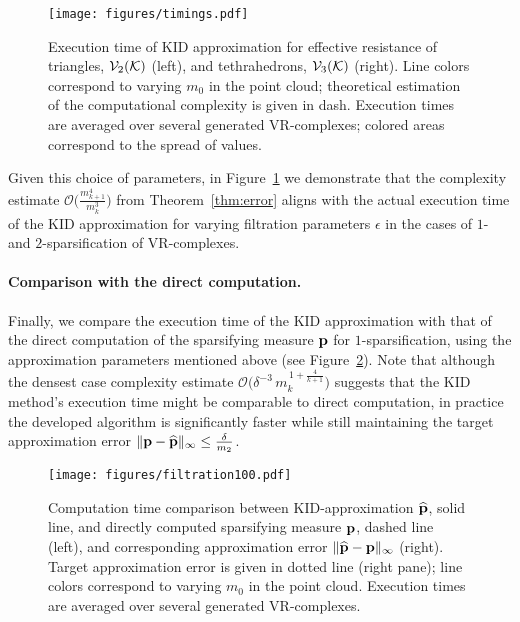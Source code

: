 \begin{figure}[t]
      \centering
      \texttt{[image: figures/timings.pdf]}
      \caption{
            Execution time of KID approximation for effective resistance of triangles, \( \mathcal{V}_{2}(\mathcal{K})\) (left), and tethrahedrons, \( \mathcal{V}_{3}(\mathcal{K}) \) (right). Line colors correspond to varying \( m_0 \)  in the point cloud; theoretical estimation of the computational complexity is given in dash.
            Execution times are averaged over several generated VR-complexes; colored areas correspond to the spread of values.  \label{fig:times}
       }
\end{figure}

Given this choice of parameters, in Figure~\ref{fig:times} we demonstrate that the complexity estimate
\(\mathcal{O}\!\bigl(\tfrac{m_{k+1}^4}{m_k^3}\bigr)\)
from Theorem~\ref{thm:error} aligns with the actual execution time of the KID approximation for varying filtration parameters \(\epsilon\) in the cases of \(1\)- and \(2\)-sparsification of VR-complexes.

\paragraph{Comparison with the direct computation.}

Finally, we compare the execution time of the KID approximation with that of the direct computation of the sparsifying measure \( \mathbf{p} \) for \( 1 \)-sparsification, using the approximation parameters mentioned above (see Figure~\ref{fig:comparison}). Note that although the densest case complexity estimate 
\(\mathcal{O}\!\bigl(\delta^{-3}\,m_k^{\,1+\frac{4}{k+1}}\bigr)\)
suggests that the KID method's execution time might be comparable to direct computation, in practice the developed algorithm is significantly faster while still maintaining the target approximation error 
\(\|\mathbf{p} - \widehat{\mathbf{p}}\|_\infty \le \frac{\delta}{m_2}\).


\begin{figure}[t]
      \centering
      \texttt{[image: figures/filtration100.pdf]}
      \caption{
            Computation time comparison between KID-approximation \( \widehat{ \mathbf{p}} \), solid line, and directly computed sparsifying measure \( \mathbf{p} \), dashed line (left), and corresponding approximation error \( \| \widehat{ \mathbf{p}} - \mathbf{p} \|_\infty \) (right). Target approximation error is given in dotted line (right pane);  line colors correspond to varying \( m_0 \)  in the point cloud.
            Execution times are averaged over several generated VR-complexes. \label{fig:comparison}      
      }
\end{figure}

